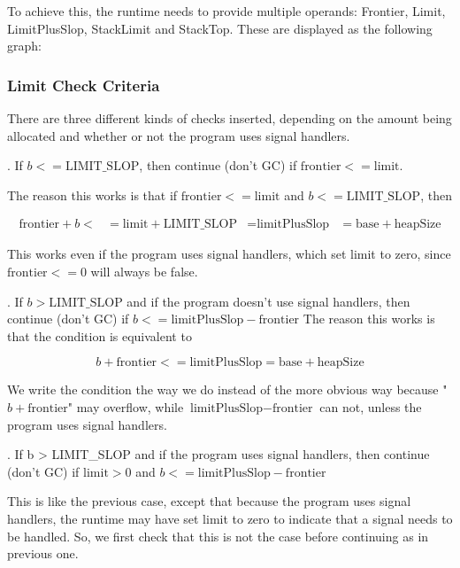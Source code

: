 To achieve this, the runtime needs to provide multiple operands: Frontier,
Limit, LimitPlusSlop, StackLimit and StackTop. These are displayed as
the following graph:


\subsubsection{Limit Check Criteria}
There are three different kinds of checks inserted, depending on the
amount being allocated and whether or not the program uses signal
handlers.

. If $b <= \mbox{LIMIT_SLOP}$, then continue (don't GC) if
$\mbox{frontier} <= \mbox{limit}$.

The reason this works is that if $\mbox{frontier} <= \mbox{limit}$ and
$b <= \mbox{LIMIT_SLOP}$, then

\begin{align}
  \mbox{frontier} + b <&= \mbox{limit} + \mbox{LIMIT_SLOP}
                       &= \mbox{limitPlusSlop}
                       &= \mbox{base} + \mbox{heapSize}
\end{align}

This works even if the program uses signal handlers, which set
limit to zero, since $\mbox{frontier} <= 0$ will always be false.

. If $b > \mbox{LIMIT_SLOP}$ and if the program doesn't use
signal handlers, then continue (don't GC) if $b <=
\mbox{limitPlusSlop} - \mbox{frontier}$ The reason this works is that
the condition is equivalent to

\begin{equation}
  b + \mbox{frontier} <= \mbox{limitPlusSlop} = \mbox{base} +
  \mbox{heapSize}
\end{equation}

We write the condition the way we do instead of the more obvious way
because "$b + \mbox{frontier}$" may overflow, while
$\mbox{limitPlusSlop} - \mbox{frontier}$ can not, unless the program
uses signal handlers.

. If b > LIMIT_SLOP and if the program uses signal
handlers, then continue (don't GC) if $\mbox{limit} > 0$ and $b <=
\mbox{limitPlusSlop} - \mbox{frontier}$

This is like the previous case, except that because the program uses signal
handlers, the runtime may have set limit to zero to indicate that a
signal needs to be handled.  So, we first check that this is not
the case before continuing as in previous one.


